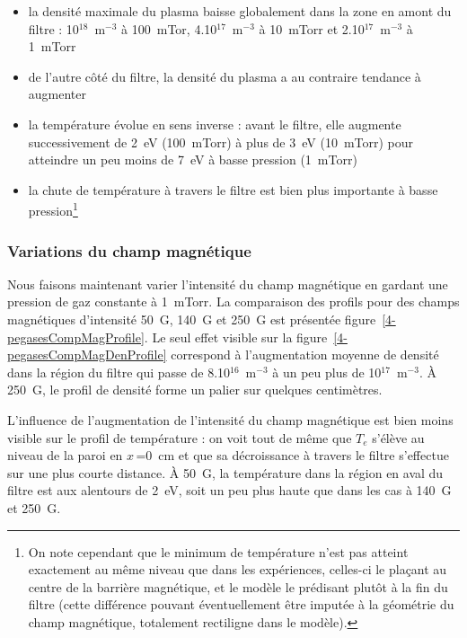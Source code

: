 \begin{refsection}
	\begin{itemize}
	  \item la densité maximale du plasma baisse globalement dans la zone en amont
	  du filtre : 10$^{18}$~m$^{-3}$ à 100~mTor, 4.10$^{17}$~m$^{-3}$ à 10~mTorr et
	  2.10$^{17}$~m$^{-3}$ à 1~mTorr
	  \item de l'autre côté du filtre, la densité du plasma a au contraire
	  tendance à augmenter
	  \item la température évolue en sens inverse : avant le filtre, elle augmente
	  successivement de 2~eV (100~mTorr) à plus de 3~eV (10~mTorr) pour atteindre
	  un peu moins de 7~eV à basse pression (1~mTorr) 
	  \item la chute de température à travers le
	  filtre est bien plus importante à basse pression\footnote{On note cependant que le minimum de température n'est pas atteint exactement
au même niveau que dans les expériences, celles-ci le plaçant au centre de la
barrière magnétique, et le modèle le prédisant plutôt à la fin du filtre (cette
différence pouvant éventuellement être imputée à la géométrie du champ
magnétique, totalement rectiligne dans le modèle).}
	\end{itemize}
	


	\subsubsection{Variations du champ magnétique}
	
	Nous faisons maintenant varier l'intensité du champ magnétique en gardant une
	pression de gaz constante à 1~mTorr. La comparaison des profils pour des champs
	magnétiques d'intensité 50~G, 140~G et 250~G est présentée
	figure~\ref{4-pegasesCompMagProfile}. Le seul effet visible sur la
	figure~\ref{4-pegasesCompMagDenProfile} correspond à l'augmentation moyenne de
	densité dans la région du filtre qui passe de 8.10$^{16}$~m$^{-3}$ à un peu
	plus de 10$^{17}$~m$^{-3}$. À 250~G, le profil de densité forme un palier
	sur quelques centimètres.
	
	L'influence de l'augmentation de l'intensité du champ magnétique est bien moins
	visible sur le profil de température : on voit tout de même que $T_e$
	s'élève au niveau de la paroi en $x\,$=0~cm et que sa décroissance à travers le
	filtre s'effectue sur une plus courte distance. À 50~G, la température dans la
	région en aval du filtre est aux alentours de 2~eV, soit un peu plus haute que
	dans les cas à 140~G et 250~G.
	

\end{refsection}
